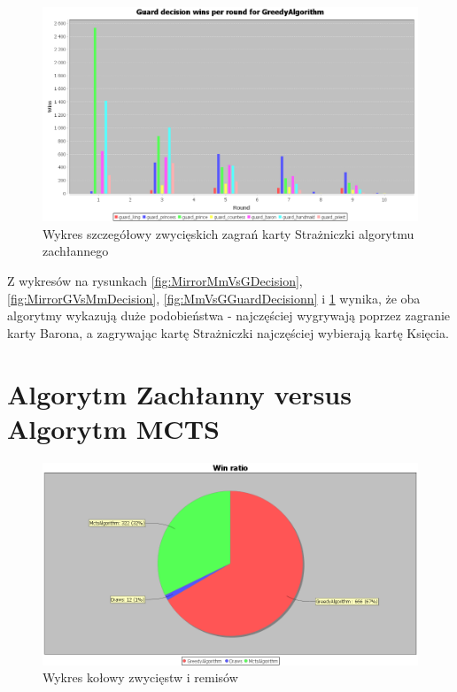 \begin{figure}[H]
	\centering
	\includegraphics[width=\textwidth]{Resources/MirrorMmVsG/GVsMmGuardDecision.PNG}
	\caption{Wykres szczegółowy zwycięskich zagrań karty Strażniczki algorytmu zachłannego} 
	\label{fig:GVsMmGuardDecision}
\end{figure}


Z wykresów na rysunkach \ref{fig:MirrorMmVsGDecision}, \ref{fig:MirrorGVsMmDecision}, \ref{fig:MmVsGGuardDecisionn} i \ref{fig:GVsMmGuardDecision} wynika, że oba algorytmy wykazują duże podobieństwa - najczęściej wygrywają poprzez zagranie karty Barona, a zagrywając kartę Strażniczki najczęściej wybierają kartę Księcia.

\clearpage
\section{Algorytm Zachłanny versus Algorytm MCTS}

\begin{figure}[H]
	\centering
	\includegraphics[width=\textwidth]{Resources/MirrorMctsVG/GVsMctsWin.PNG}
	\caption{Wykres kołowy zwycięstw i remisów} 
	\label{fig:GVsMctsWin}
\end{figure}


